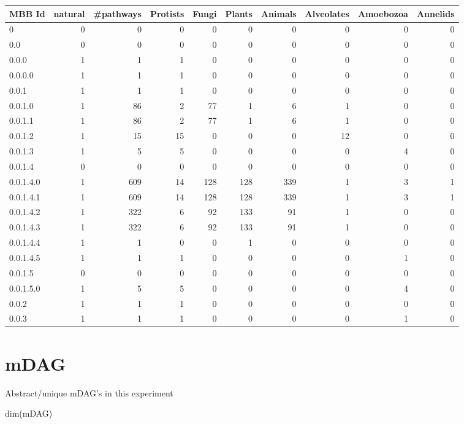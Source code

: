 \documentclass[
  letterpaper,
  DIV=11,
  numbers=noendperiod]{scrreprt}
\newenvironment{Shaded}{}{}
\newcommand{\FunctionTok}[1]{\textcolor[rgb]{0.38,0.69,0.94}{#1}}
\newcommand{\NormalTok}[1]{\textcolor[rgb]{0.67,0.70,0.75}{#1}}
\begin{document}
\begin{tabular}{l|r|r|r|r|r|r|r|r|r}
\hline
MBB Id & natural & \#pathways & Protists & Fungi & Plants & Animals & Alveolates & Amoebozoa & Annelids\\
\hline
0 & 0 & 0 & 0 & 0 & 0 & 0 & 0 & 0 & 0\\
\hline
0.0 & 0 & 0 & 0 & 0 & 0 & 0 & 0 & 0 & 0\\
\hline
0.0.0 & 1 & 1 & 1 & 0 & 0 & 0 & 0 & 0 & 0\\
\hline
0.0.0.0 & 1 & 1 & 1 & 0 & 0 & 0 & 0 & 0 & 0\\
\hline
0.0.1 & 1 & 1 & 1 & 0 & 0 & 0 & 0 & 0 & 0\\
\hline
0.0.1.0 & 1 & 86 & 2 & 77 & 1 & 6 & 1 & 0 & 0\\
\hline
0.0.1.1 & 1 & 86 & 2 & 77 & 1 & 6 & 1 & 0 & 0\\
\hline
0.0.1.2 & 1 & 15 & 15 & 0 & 0 & 0 & 12 & 0 & 0\\
\hline
0.0.1.3 & 1 & 5 & 5 & 0 & 0 & 0 & 0 & 4 & 0\\
\hline
0.0.1.4 & 0 & 0 & 0 & 0 & 0 & 0 & 0 & 0 & 0\\
\hline
0.0.1.4.0 & 1 & 609 & 14 & 128 & 128 & 339 & 1 & 3 & 1\\
\hline
0.0.1.4.1 & 1 & 609 & 14 & 128 & 128 & 339 & 1 & 3 & 1\\
\hline
0.0.1.4.2 & 1 & 322 & 6 & 92 & 133 & 91 & 1 & 0 & 0\\
\hline
0.0.1.4.3 & 1 & 322 & 6 & 92 & 133 & 91 & 1 & 0 & 0\\
\hline
0.0.1.4.4 & 1 & 1 & 0 & 0 & 1 & 0 & 0 & 0 & 0\\
\hline
0.0.1.4.5 & 1 & 1 & 1 & 0 & 0 & 0 & 0 & 1 & 0\\
\hline
0.0.1.5 & 0 & 0 & 0 & 0 & 0 & 0 & 0 & 0 & 0\\
\hline
0.0.1.5.0 & 1 & 5 & 5 & 0 & 0 & 0 & 0 & 4 & 0\\
\hline
0.0.2 & 1 & 1 & 1 & 0 & 0 & 0 & 0 & 0 & 0\\
\hline
0.0.3 & 1 & 1 & 1 & 0 & 0 & 0 & 0 & 1 & 0\\
\hline
\end{tabular}

\hypertarget{mdag}{%
\section{mDAG}\label{mdag}}

Abstract/unique mDAG's in this experiment

\begin{Shaded}
\begin{Highlighting}[]
\FunctionTok{dim}\NormalTok{(mDAG)}
\end{Highlighting}
\end{Shaded}
\end{document}
